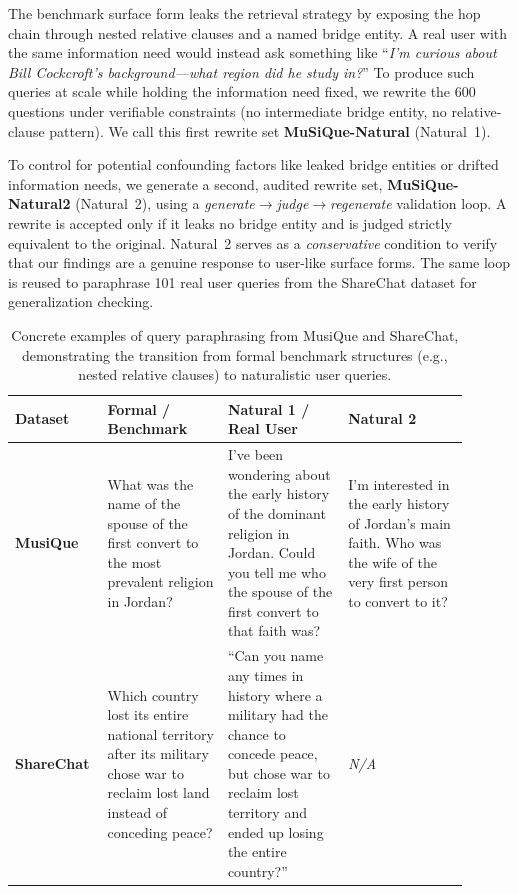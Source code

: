 \documentclass[10pt, letterpaper]{article}
\begin{document}
The benchmark surface form leaks the retrieval strategy by exposing the
hop chain through nested relative clauses and a named bridge entity. A real user with the
same information need would instead ask something like ``\emph{I'm curious about Bill
Cockcroft's background---what region did he study in?}'' To produce such queries at scale
while holding the information need fixed, we rewrite the $600$ questions under verifiable constraints (no intermediate bridge entity, no relative-clause pattern).
We call this first rewrite set \textbf{MuSiQue-Natural} (Natural~1).

To control for potential confounding factors like leaked bridge entities or drifted information needs, we generate a second, audited rewrite set,
\textbf{MuSiQue-Natural2} (Natural~2), using a \emph{generate$\to$judge$\to$regenerate}
validation loop. A rewrite is accepted only if it leaks no bridge entity and
is judged strictly equivalent to the original. Natural~2 serves as a \emph{conservative} condition to verify that our findings are a genuine response to user-like surface forms. The same loop is reused
to paraphrase 101 real user queries from the ShareChat dataset for generalization checking.

\begin{table}[ht]
  \centering
  \small
  \begin{tabular}{p{0.15\linewidth} p{0.25\linewidth} p{0.25\linewidth} p{0.25\linewidth}}
    \toprule
    \textbf{Dataset} & \textbf{Formal / Benchmark} & \textbf{Natural 1 / Real User} & \textbf{Natural 2} \\
    \midrule
    \textbf{MusiQue} & What was the name of the spouse of the first convert to the most prevalent religion in Jordan? & I've been wondering about the early history of the dominant religion in Jordan. Could you tell me who the spouse of the first convert to that faith was? & I'm interested in the early history of Jordan's main faith. Who was the wife of the very first person to convert to it? \\
    \midrule
    \textbf{ShareChat} & Which country lost its entire national territory after its military chose war to reclaim lost land instead of conceding peace? & ``Can you name any times in history where a military had the chance to concede peace, but chose war to reclaim lost territory and ended up losing the entire country?'' & \textit{N/A} \\
    \bottomrule
  \end{tabular}
  \caption{Concrete examples of query paraphrasing from MusiQue and ShareChat, demonstrating the transition from formal benchmark structures (e.g., nested relative clauses) to naturalistic user queries.}
  \label{tab:paraphrase_examples}
\end{table}
\end{document}
